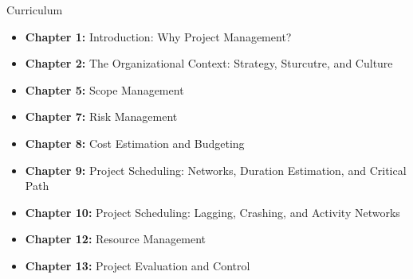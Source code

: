 
{\Huge Curriculum} \\

	\begin{itemize}
		\item {\bf Chapter 1:} Introduction: Why Project Management? 
		\item {\bf Chapter 2:} The Organizational Context: Strategy, Sturcutre, and Culture
		\item {\bf Chapter 5:} Scope Management 
		\item {\bf Chapter 7:} Risk Management 
		\item {\bf Chapter 8:} Cost Estimation and Budgeting 
		\item {\bf Chapter 9:} Project Scheduling: Networks, Duration Estimation, and Critical Path 
		\item {\bf Chapter 10:} Project Scheduling: Lagging, Crashing, and Activity Networks  
		\item {\bf Chapter 12:} Resource Management 
		\item {\bf Chapter 13:} Project Evaluation and Control
	\end{itemize}